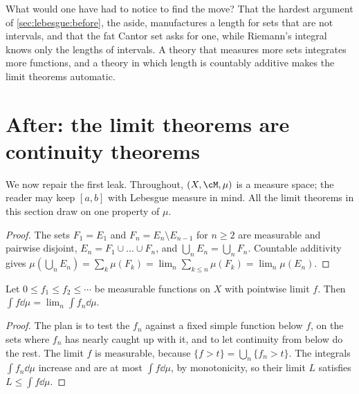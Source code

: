 \begin{refsection}
What would one have had to notice to find the move? That the hardest argument of \cref{sec:lebesgue:before}, the aside, manufactures a length for sets that are not intervals, and that the fat Cantor set asks for one, while Riemann's integral knows only the lengths of intervals. A theory that measures more sets integrates more functions, and a theory in which length is countably additive makes the limit theorems automatic.

\section{After: the limit theorems are continuity theorems}\label{sec:lebesgue:limits}

We now repair the first leak. Throughout, $(X,\cM,\mu)$ is a measure space; the reader may keep $[a,b]$ with Lebesgue measure in mind. All the limit theorems in this section draw on one property of $\mu$.


\begin{proof}
The sets $F_1=E_1$ and $F_n=E_n\setminus E_{n-1}$ for $n\ge2$ are measurable and pairwise disjoint, $E_n=F_1\cup\dots\cup F_n$, and $\bigcup_nE_n=\bigcup_nF_n$. Countable additivity gives $\mu(\bigcup_nE_n)=\sum_k\mu(F_k)=\lim_n\sum_{k\le n}\mu(F_k)=\lim_n\mu(E_n)$.
\end{proof}

\begin{theorem}\label{thm:lebesgue:mct}
Let $0\le f_1\le f_2\le\cdots$ be measurable functions on $X$ with pointwise limit $f$. Then $\int f\dd\mu=\lim_n\int f_n\dd\mu$.
\end{theorem}

\begin{proof}
The plan is to test the $f_n$ against a fixed simple function below $f$, on the sets where $f_n$ has nearly caught up with it, and to let continuity from below do the rest. The limit $f$ is measurable, because $\{f>t\}=\bigcup_n\{f_n>t\}$. The integrals $\int f_n\dd\mu$ increase and are at most $\int f\dd\mu$, by monotonicity, so their limit $L$ satisfies $L\le\int f\dd\mu$.


\end{proof}
\end{refsection}
